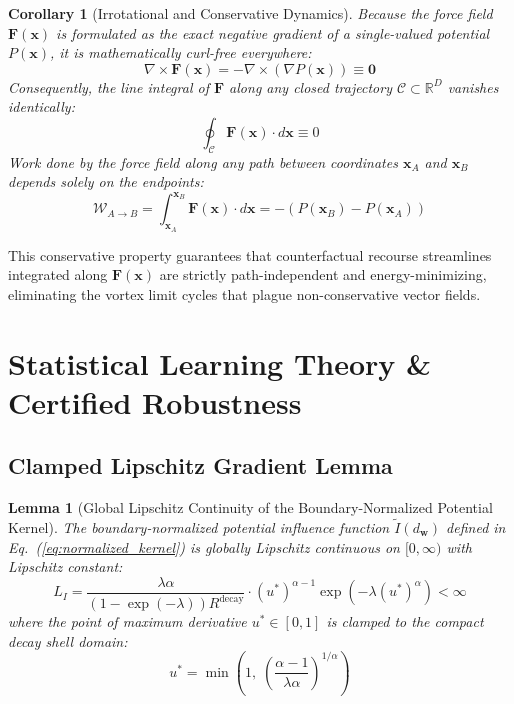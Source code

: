 \documentclass[times, review, 10pt]{elsarticle}
\newtheorem{lemma}{Lemma}
\newtheorem{corollary}{Corollary}
\begin{document}
\begin{corollary}[Irrotational and Conservative Dynamics]
Because the force field $\mathbf{F}(\mathbf{x})$ is formulated as the exact negative gradient of a single-valued potential $P(\mathbf{x})$, it is mathematically curl-free everywhere:
\begin{equation}
\nabla \times \mathbf{F}(\mathbf{x}) = -\nabla \times (\nabla P(\mathbf{x})) \equiv \mathbf{0}
\label{eq:curl_free}
\end{equation}
Consequently, the line integral of $\mathbf{F}$ along any closed trajectory $\mathcal{C} \subset \mathbb{R}^D$ vanishes identically:
\begin{equation}
\oint_{\mathcal{C}} \mathbf{F}(\mathbf{x}) \cdot d\mathbf{x} \equiv 0
\end{equation}
Work done by the force field along any path between coordinates $\mathbf{x}_A$ and $\mathbf{x}_B$ depends solely on the endpoints:
\begin{equation}
\mathcal{W}_{A \to B} = \int_{\mathbf{x}_A}^{\mathbf{x}_B} \mathbf{F}(\mathbf{x}) \cdot d\mathbf{x} = -(P(\mathbf{x}_B) - P(\mathbf{x}_A))
\end{equation}
\end{corollary}
This conservative property guarantees that counterfactual recourse streamlines integrated along $\mathbf{F}(\mathbf{x})$ are strictly path-independent and energy-minimizing, eliminating the vortex limit cycles that plague non-conservative vector fields.

\section{Statistical Learning Theory \& Certified Robustness}
\label{sec:theory}

\subsection{Clamped Lipschitz Gradient Lemma}
\begin{lemma}[Global Lipschitz Continuity of the Boundary-Normalized Potential Kernel]
\label{lem:lipschitz}
The boundary-normalized potential influence function $\tilde{I}(d_{\mathbf{w}})$ defined in Eq.~(\ref{eq:normalized_kernel}) is globally Lipschitz continuous on $[0, \infty)$ with Lipschitz constant:
\begin{equation}
L_I = \frac{\lambda \alpha}{(1 - \exp(-\lambda)) R^{\mathrm{decay}}} \cdot (u^*)^{\alpha - 1} \exp(-\lambda (u^*)^\alpha) < \infty
\label{eq:lipschitz_constant}
\end{equation}
where the point of maximum derivative $u^* \in [0, 1]$ is clamped to the compact decay shell domain:
\begin{equation}
u^* = \min\left(1, \; \left(\frac{\alpha - 1}{\lambda \alpha}\right)^{1/\alpha}\right)
\label{eq:clamped_u}
\end{equation}
\end{lemma}
\end{document}
